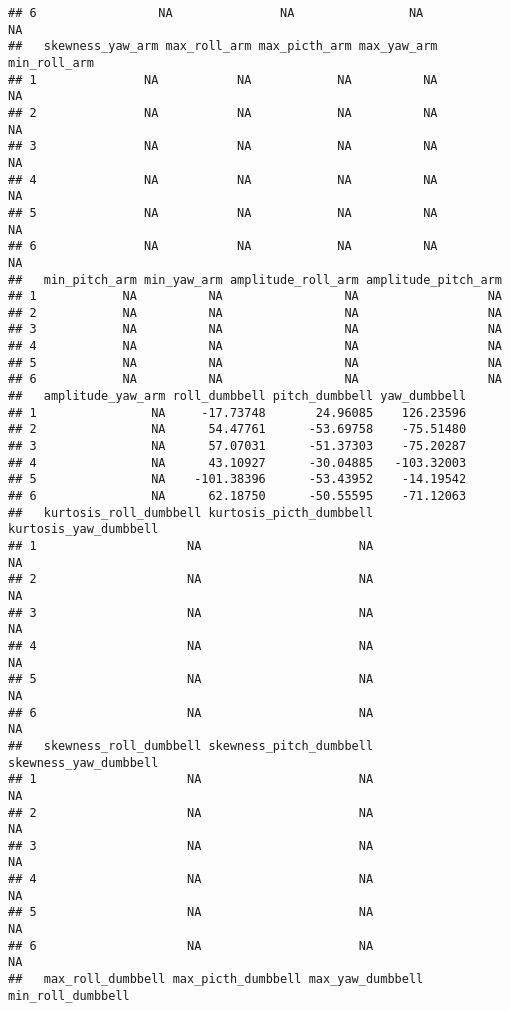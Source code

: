 \documentclass[]{article}
\begin{document}
\begin{verbatim}
## 6                 NA               NA                NA                 NA
##   skewness_yaw_arm max_roll_arm max_picth_arm max_yaw_arm min_roll_arm
## 1               NA           NA            NA          NA           NA
## 2               NA           NA            NA          NA           NA
## 3               NA           NA            NA          NA           NA
## 4               NA           NA            NA          NA           NA
## 5               NA           NA            NA          NA           NA
## 6               NA           NA            NA          NA           NA
##   min_pitch_arm min_yaw_arm amplitude_roll_arm amplitude_pitch_arm
## 1            NA          NA                 NA                  NA
## 2            NA          NA                 NA                  NA
## 3            NA          NA                 NA                  NA
## 4            NA          NA                 NA                  NA
## 5            NA          NA                 NA                  NA
## 6            NA          NA                 NA                  NA
##   amplitude_yaw_arm roll_dumbbell pitch_dumbbell yaw_dumbbell
## 1                NA     -17.73748       24.96085    126.23596
## 2                NA      54.47761      -53.69758    -75.51480
## 3                NA      57.07031      -51.37303    -75.20287
## 4                NA      43.10927      -30.04885   -103.32003
## 5                NA    -101.38396      -53.43952    -14.19542
## 6                NA      62.18750      -50.55595    -71.12063
##   kurtosis_roll_dumbbell kurtosis_picth_dumbbell kurtosis_yaw_dumbbell
## 1                     NA                      NA                    NA
## 2                     NA                      NA                    NA
## 3                     NA                      NA                    NA
## 4                     NA                      NA                    NA
## 5                     NA                      NA                    NA
## 6                     NA                      NA                    NA
##   skewness_roll_dumbbell skewness_pitch_dumbbell skewness_yaw_dumbbell
## 1                     NA                      NA                    NA
## 2                     NA                      NA                    NA
## 3                     NA                      NA                    NA
## 4                     NA                      NA                    NA
## 5                     NA                      NA                    NA
## 6                     NA                      NA                    NA
##   max_roll_dumbbell max_picth_dumbbell max_yaw_dumbbell min_roll_dumbbell

\end{verbatim}
\end{document}
